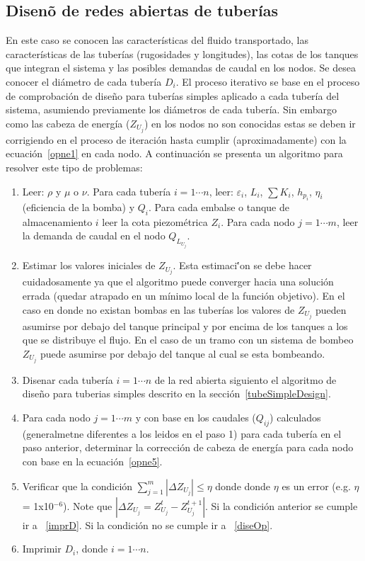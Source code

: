 \documentclass[11pt, oneside]{article}
\begin{document}
\subsection{Disen\~o de  redes abiertas de tuber\'ias}
En este caso se conocen las caracter\'isticas del fluido transportado, las caracter\'isticas de las tuber\'ias (rugosidades y longitudes), las cotas de los tanques que integran el sistema y las posibles demandas de caudal en los nodos. Se desea conocer el di\'ametro de cada tuber\'ia $D_i$. El proceso iterativo se base en el proceso de comprobaci\'on de dise\~no para tuber\'ias simples aplicado a cada tuber\'ia del sistema, asumiendo previamente los di\'ametros de cada tuber\'ia. Sin embargo como las cabeza de energ\'ia ($Z_{U_j}$) en los nodos no son conocidas estas se deben ir corrigiendo en el proceso de iteraci\'on hasta cumplir (aproximadamente) con la ecuaci\'on~\ref{opne1} en cada nodo. A continuaci\'on se presenta un algoritmo para resolver este tipo de problemas:

\begin{enumerate}
\item Leer: $\rho$ y $\mu$ o $\nu$. Para cada tuber\'ia $i=1\cdots n$, leer: $\varepsilon_i$, $L_i$, $\sum K_i$, $h_{p_i}$, $\eta_i$ (eficiencia de la bomba) y $Q_i$. Para cada embalse o tanque de almacenamiento $i$ leer la cota piezom\'etrica $Z_i$. Para cada nodo $j=1 \cdots m$, leer la demanda de caudal en el nodo $Q_{L_{U_j}}$.

\item Estimar los valores iniciales de $Z_{U_j}$. Esta estimaci\''on se debe hacer cuidadosamente ya que el algoritmo puede converger hacia una soluci\'on errada (quedar atrapado en un m\'inimo local de la funci\'on objetivo). En el caso en donde no existan bombas en las tuber\'ias los valores de $Z_{U_j}$ pueden asumirse por debajo del tanque principal y por encima de los tanques a los que se distribuye el flujo. En el caso de un tramo con un sistema de bombeo $Z_{U_j}$ puede asumirse por debajo del tanque al cual se esta bombeando. 

\item \label{diseOp} Disenar cada tuber\'ia $i=1 \cdots n$  de la red abierta siguiento el algoritmo de dise\~no para tuberias simples descrito en la secci\'on~\ref{tubeSimpleDesign}.

\item Para cada nodo $j = 1 \cdots m$ y con base en los caudales ($Q_{ij}$) calculados (generalmetne diferentes a los leidos en el paso 1) para cada tuber\'ia en el paso anterior, determinar la correcci\'on de cabeza de energ\'ia para cada nodo con base en la ecuaci\'on~\ref{opne5}. 

\item Verificar que la condici\'on $\sum_{j=1}^m | \Delta Z_{U_j} | \leq \eta $ donde donde $\eta$ es un error  (e.g. $\eta$ = 1x10$^{-6}$). Note que $| \Delta Z_{U_j} = Z_{U_j}^t - Z_{U_j}^{t+1} |$. Si la condici\'on anterior se cumple ir a ~\ref{imprD}. Si la condici\'on no se cumple ir a ~\ref{diseOp}.

\item \label{imprD} Imprimir $D_i$, donde $i= 1 \cdots n$. 
\end{enumerate}
\end{document}
